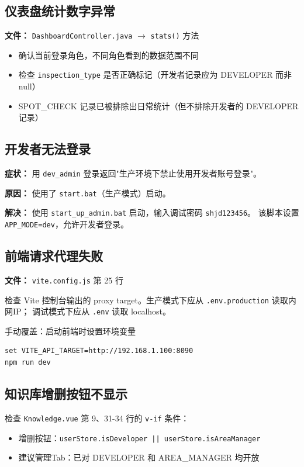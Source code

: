 \documentclass[12pt,a4paper]{ctexart}
\begin{document}
\subsection{仪表盘统计数字异常}

\textbf{文件：} \texttt{DashboardController.java} $\rightarrow$ \texttt{stats()} 方法

\begin{itemize}
    \item 确认当前登录角色，不同角色看到的数据范围不同
    \item 检查 \texttt{inspection\_type} 是否正确标记（开发者记录应为 DEVELOPER 而非 null）
    \item SPOT\_CHECK 记录已被排除出日常统计（但不排除开发者的 DEVELOPER 记录）
\end{itemize}

\subsection{开发者无法登录}

\textbf{症状：} 用 \texttt{dev\_admin} 登录返回"生产环境下禁止使用开发者账号登录"。

\textbf{原因：} 使用了 \texttt{start.bat}（生产模式）启动。

\textbf{解决：} 使用 \texttt{start\_up\_admin.bat} 启动，输入调试密码 \texttt{shjd123456}。
该脚本设置 \texttt{APP\_MODE=dev}，允许开发者登录。

\subsection{前端请求代理失败}

\textbf{文件：} \texttt{vite.config.js} 第 25 行

检查 Vite 控制台输出的 proxy target。生产模式下应从 \texttt{.env.production} 读取内网IP；
调试模式下应从 \texttt{.env} 读取 localhost。

手动覆盖：启动前端时设置环境变量
\begin{lstlisting}[language=batch]
set VITE_API_TARGET=http://192.168.1.100:8090
npm run dev
\end{lstlisting}

\subsection{知识库增删按钮不显示}

检查 \texttt{Knowledge.vue} 第 9、31-34 行的 \texttt{v-if} 条件：
\begin{itemize}
    \item 增删按钮：\texttt{userStore.isDeveloper || userStore.isAreaManager}
    \item 建议管理Tab：已对 DEVELOPER 和 AREA\_MANAGER 均开放
\end{itemize}
\end{document}
